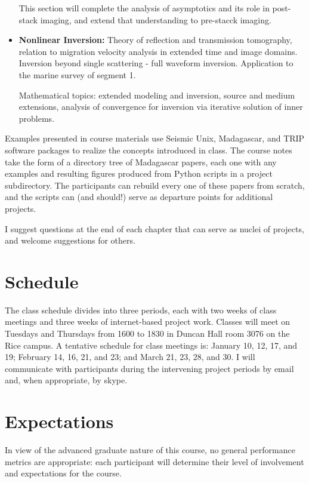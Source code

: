 \begin{itemize}
This section will complete the analysis of asymptotics and its role in post-stack imaging, and extend that understanding to pre-stacck imaging. 

\item {\bf Nonlinear Inversion:} Theory of reflection and transmission tomography, relation to migration velocity analysis in extended time and image domains. Inversion beyond single scattering - full waveform inversion.  Application to the marine survey of segment 1. 

Mathematical topics: extended modeling and inversion, source and medium extensions, analysis of convergence for inversion via iterative solution of inner problems. 
\end{itemize}

Examples presented in course materials use Seismic Unix, Madagascar, and TRIP software packages to realize the concepts introduced in class. The course notes take the form of a directory tree of Madagascar papers, each one with any examples and resulting figures produced from Python scripts in a project subdirectory. The participants can rebuild every one of these papers from scratch, and the scripts can (and should!) serve as departure points for additional projects.

I suggest questions at the end of each chapter that can serve as nuclei of projects, and welcome suggestions for others.

\section{Schedule}
The class schedule divides into three periods, each with two weeks of class meetings and three weeks of internet-based project work. Classes will meet on Tuesdays and Thursdays from 1600 to 1830 in Duncan Hall room 3076 on the Rice campus. A tentative schedule for class meetings is: January 10, 12, 17, and 19; February 14, 16, 21, and 23; and March 21, 23, 28, and 30. I will communicate with participants during the intervening project periods by email and, when appropriate, by skype.

\section{Expectations}
In view of the advanced graduate nature of this course, no general performance metrics are appropriate: each participant will determine their level of involvement and expectations for the course.

